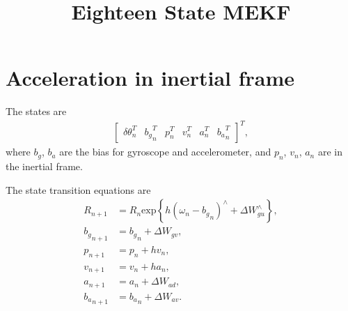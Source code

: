 \documentclass[10pt]{article}
\title{\vspace{-4ex}\textbf{Eighteen State MEKF\vspace{-4ex}}}
\date{}
\newcommand{\expb}[1]{\ensuremath{\mathrm{exp}\left\{#1\right\}}}
\begin{document}
\maketitle

\section{Acceleration in inertial frame}

The states are
\begin{align}
	\begin{bmatrix}
		\delta\theta_n^T & {b_g}_n^T & p_n^T & v_n^T & a_n^T & {b_a}_n^T
	\end{bmatrix}^T,
\end{align}
where $b_g$, $b_a$ are the bias for gyroscope and accelerometer, and $p_n$, $v_n$, $a_n$ are in the inertial frame.

The state transition equations are
\begin{align}
	R_{n+1} &= R_n \expb{h (\omega_n-{b_g}_n)^\wedge + \Delta W_{gu}^\wedge}, \\
	{b_g}_{n+1} &= {b_g}_n + \Delta W_{gv}, \\
	p_{n+1} &= p_n + h v_n, \\
	v_{n+1} &= v_n + h a_n, \\
	a_{n+1} &= a_n + \Delta W_{ad}, \\
	{b_a}_{n+1} &= {b_a}_n + \Delta W_{av}.
\end{align}
\end{document}
